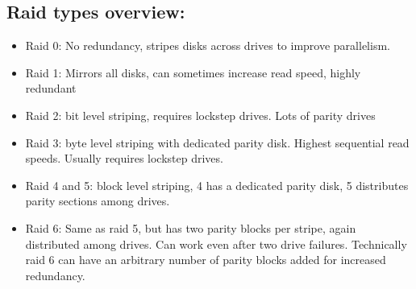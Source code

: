 \documentclass[letterpaper,landscape]{article}
\begin{document}
\begin{multicols}{2}
\section{Raid types overview:}
\begin{itemize}
	\item Raid 0: No redundancy, stripes disks across drives to improve parallelism. 
	\item Raid 1: Mirrors all disks, can sometimes increase read speed, highly redundant
	\item Raid 2: bit level striping, requires lockstep drives. Lots of parity drives
	\item Raid 3: byte level striping with dedicated parity disk. Highest sequential read speeds. Usually requires lockstep drives.
	\item Raid 4 and 5: block level striping, 4 has a dedicated parity disk, 5 distributes parity sections among drives.
	\item Raid 6: Same as raid 5, but has two parity blocks per stripe, again distributed among drives. Can work even after two drive failures. Technically raid 6 can have an arbitrary number of parity blocks added for increased redundancy.
\end{itemize}





\end{multicols}
\end{document}
